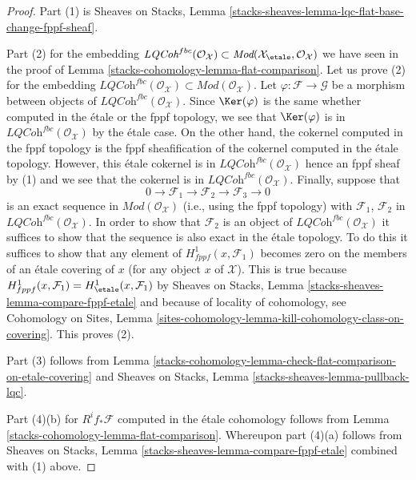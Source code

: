 \begin{proof}
Part (1) is
Sheaves on Stacks, Lemma
\ref{stacks-sheaves-lemma-lqc-flat-base-change-fppf-sheaf}.

\medskip\noindent
Part (2) for the embedding
$\textit{LQCoh}^{fbc}(\mathcal{O}_\mathcal{X}) \subset
\textit{Mod}(\mathcal{X}_\etale, \mathcal{O}_\mathcal{X})$
we have seen in the proof of
Lemma \ref{stacks-cohomology-lemma-flat-comparison}.
Let us prove (2) for the embedding
$\textit{LQCoh}^{fbc}(\mathcal{O}_\mathcal{X}) \subset
\textit{Mod}(\mathcal{O}_\mathcal{X})$.
Let $\varphi : \mathcal{F} \to \mathcal{G}$ be a morphism between
objects of $\textit{LQCoh}^{fbc}(\mathcal{O}_\mathcal{X})$. Since
$\Ker(\varphi)$
is the same whether computed in the \'etale or the fppf
topology, we see that $\Ker(\varphi)$ is in
$\textit{LQCoh}^{fbc}(\mathcal{O}_\mathcal{X})$
by the \'etale case. On the other hand,
the cokernel computed in the fppf topology is the fppf sheafification
of the cokernel computed in the \'etale topology. However, this
\'etale cokernel is in $\textit{LQCoh}^{fbc}(\mathcal{O}_\mathcal{X})$
hence an fppf sheaf
by (1) and we see that the cokernel is in
$\textit{LQCoh}^{fbc}(\mathcal{O}_\mathcal{X})$.
Finally, suppose that
$$
0 \to \mathcal{F}_1 \to \mathcal{F}_2 \to \mathcal{F}_3 \to 0
$$
is an exact sequence in $\textit{Mod}(\mathcal{O}_\mathcal{X})$
(i.e., using the fppf topology) with $\mathcal{F}_1$, $\mathcal{F}_2$
in $\textit{LQCoh}^{fbc}(\mathcal{O}_\mathcal{X})$. In order to show that
$\mathcal{F}_2$ is an object of $\textit{LQCoh}^{fbc}(\mathcal{O}_\mathcal{X})$
it suffices to show that
the sequence is also exact in the \'etale topology. To do this it
suffices to show that any element of $H^1_{fppf}(x, \mathcal{F}_1)$
becomes zero on the members of an \'etale covering of $x$ (for any
object $x$ of $\mathcal{X}$). This is true because
$H^1_{fppf}(x, \mathcal{F}_1) = H^1_\etale(x, \mathcal{F}_1)$ by
Sheaves on Stacks, Lemma \ref{stacks-sheaves-lemma-compare-fppf-etale}
and because of locality of cohomology, see
Cohomology on Sites, Lemma
\ref{sites-cohomology-lemma-kill-cohomology-class-on-covering}.
This proves (2).

\medskip\noindent
Part (3) follows from
Lemma \ref{stacks-cohomology-lemma-check-flat-comparison-on-etale-covering}
and
Sheaves on Stacks, Lemma \ref{stacks-sheaves-lemma-pullback-lqc}.

\medskip\noindent
Part (4)(b) for $R^if_*\mathcal{F}$ computed in the \'etale cohomology
follows from Lemma \ref{stacks-cohomology-lemma-flat-comparison}.
Whereupon part (4)(a) follows from
Sheaves on Stacks, Lemma \ref{stacks-sheaves-lemma-compare-fppf-etale}
combined with (1) above.


\end{proof}

